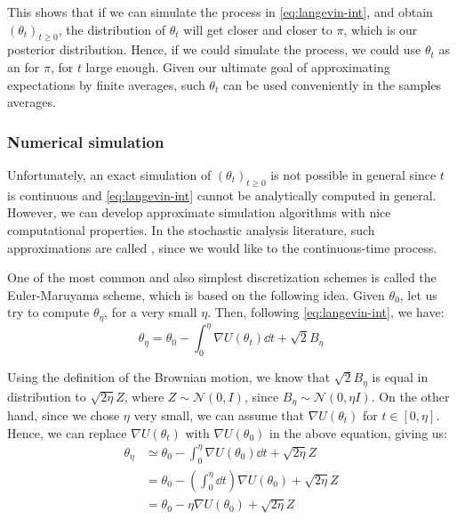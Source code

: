 \documentclass[toc, titlepaged]{../cs-classes/cs-classes}
\begin{document}
This shows that if we can simulate the process in \eqref{eq:langevin-int}, and obtain $(\theta_t)_{t\geq0}$, the distribution of $\theta_t$ will get closer and closer to $\pi$, which is our posterior distribution. Hence, if we could simulate the process, we could use $\theta_t$ as an  for $\pi$, for $t$ large enough. Given our ultimate goal of approximating expectations by finite averages, such $\theta_t$ can be used conveniently in the samples averages.

\subsubsection{Numerical simulation}
Unfortunately, an exact simulation of $(\theta_t)_{t\geq0}$ is not possible in general since $t$ is continuous and \eqref{eq:langevin-int} cannot be analytically computed in general. However, we can develop approximate simulation algorithms with nice computational properties. In the stochastic analysis literature, such approximations are called , since we would like to 
the continuous-time process.

One of the most common and also simplest discretization schemes is called the Euler-Maruyama scheme, which is based on the following idea. Given $\theta_0$, let us try to compute $\theta_\eta$, for a very small $\eta$.
Then, following \eqref{eq:langevin-int}, we have:
\begin{equation}
    \theta_\eta=\theta_0-\int_0^\eta\nabla U(\theta_t)\dd t + \sqrt{2}B_\eta
\end{equation}

Using the definition of the Brownian motion, we know that $\sqrt{2}B_\eta$ is equal in distribution to $\sqrt{2\eta}Z$, where $Z\sim\mathcal{N}(0, I)$, since $B_\eta\sim\mathcal{N}(0, \eta I)$. On the other hand, since we chose $\eta$ very small, we can assume that $\nabla U(\theta_t)$  for $t\in[0, \eta]$. Hence, we can replace $\nabla U(\theta_t)$ with $\nabla U(\theta_0)$ in the above equation, giving us:
\begin{equation*}
    \begin{aligned}
        \theta_\eta &\simeq \theta_0 - \int_0^\eta\nabla U(\theta_0)\dd t + \sqrt{2\eta}Z\\
        &=\theta_0 - \left(\int_0^\eta\dd t\right)\nabla U(\theta_0) + \sqrt{2\eta}Z\\
        &= \theta_0-\eta\nabla U(\theta_0)+\sqrt{2\eta}Z
    \end{aligned}
\end{equation*}
\end{document}

